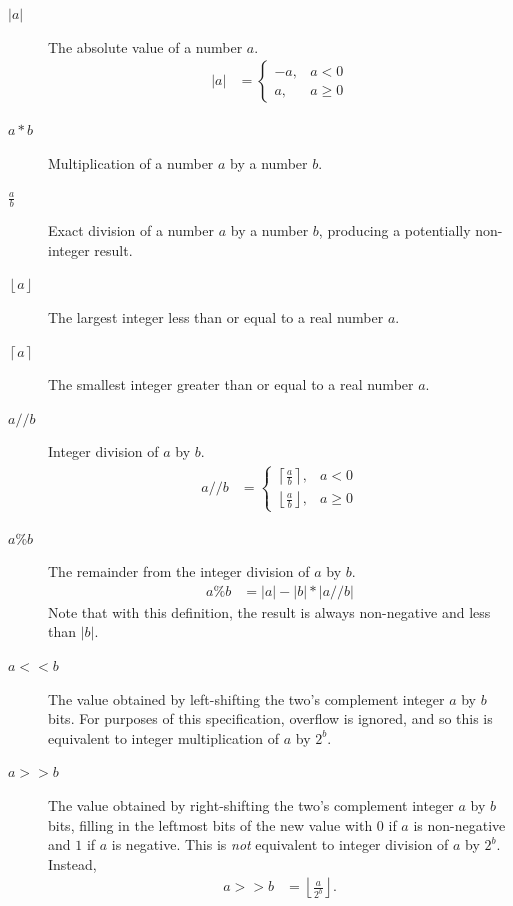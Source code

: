 \documentclass[9pt,letterpaper]{book}
\numberwithin{equation}{chapter}
\numberwithin{figure}{chapter}
\numberwithin{table}{chapter}
\begin{document}
\begin{description}
\item[$|a|$]
The absolute value of a number $a$.
\begin{align*}
|a| & = \left\{\begin{array}{ll}
-a, & a < 0 \\
a, & a \ge 0
\end{array}\right.
\end{align*}

\item[$a*b$]
Multiplication of a number $a$ by a number $b$.
\item[$\frac{a}{b}$]
Exact division of a number $a$ by a number $b$, producing a potentially
 non-integer result.

\item[$\left\lfloor a\right\rfloor$] 
The largest integer less than or equal to a real number $a$.

\item[$\left\lceil a\right\rceil$]
The smallest integer greater than or equal to a real number $a$.

\item[$a//b$]
Integer division of $a$ by $b$.
\begin{align*}
a//b & = \left\{\begin{array}{ll}
\left\lceil\frac{a}{b}\right\rceil, & a < 0 \\
\left\lfloor\frac{a}{b}\right\rfloor, & a \ge 0
\end{array}\right.
\end{align*}

\item[$a\%b$]
The remainder from the integer division of $a$ by $b$.
\begin{align*}
a\%b & = |a|-|b|*|a//b|
\end{align*}
Note that with this definition, the result is always non-negative and less than
 $|b|$.

\item[$a<<b$]
The value obtained by left-shifting the two's complement integer $a$ by $b$
 bits.
For purposes of this specification, overflow is ignored, and so this is
 equivalent to integer multiplication of $a$ by $2^b$.

\item[$a>>b$]
The value obtained by right-shifting the two's complement integer $a$ by $b$
 bits, filling in the leftmost bits of the new value with $0$ if $a$ is
 non-negative and $1$ if $a$ is negative.
This is {\em not} equivalent to integer division of $a$ by $2^b$.
Instead,
\begin{align*}
a>>b & = \left\lfloor\frac{a}{2^b}\right\rfloor.
\end{align*}


\end{description}
\end{document}
